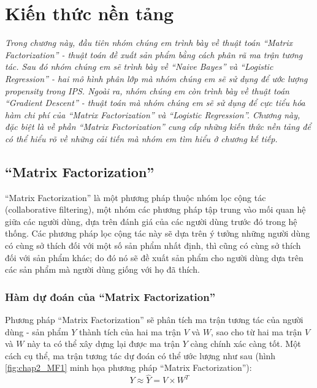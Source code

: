 \chapter{Kiến thức nền tảng}
\label{Chapter2}

\noindent \textit{Trong chương này, đầu tiên nhóm chúng em trình bày về thuật toán ``Matrix Factorization'' - thuật toán đề xuất sản phẩm bằng cách phân rã ma trận tương tác. Sau đó nhóm chúng em sẽ trình bày về ``Naive Bayes'' và ``Logistic Regression'' - hai mô hình phân lớp mà nhóm chúng em sẽ sử dụng để ước lượng propensity trong IPS. Ngoài ra, nhóm chúng em còn trình bày về thuật toán ``Gradient Descent'' - thuật toán mà nhóm chúng em sẽ sử dụng để cực tiểu hóa hàm chi phí của  ``Matrix Factorization'' và ``Logistic Regression''. Chương này, đặc biệt là về phần ``Matrix Factorization'' cung cấp những kiến thức nền tảng để có thể hiểu rõ về những cải tiến mà nhóm em tìm hiểu ở chương kế tiếp.}

\section{``Matrix Factorization''}
\label{section:MF}
``Matrix Factorization'' là một phương pháp thuộc nhóm lọc cộng tác (collaborative filtering), một nhóm các phương pháp tập trung vào mối quan hệ giữa các người dùng, dựa trên đánh giá của các người dùng trước đó trong hệ thống. Các phương pháp lọc cộng tác này sẽ dựa trên ý tưởng những người dùng có cùng sở thích đối với một số sản phẩm nhất định, thì cũng có cùng sở thích đối với sản phẩm khác; do đó nó sẽ đề xuất sản phẩm cho người dùng dựa trên các sản phẩm mà người dùng giống với họ đã thích.

\subsection{Hàm dự đoán của ``Matrix Factorization''}
Phương pháp ``Matrix Factorization'' sẽ phân tích ma trận tương tác của người dùng - sản phẩm $Y$ thành tích của hai ma trận $V$ và $W$, sao cho từ hai ma trận $V$ và $W$ này ta có thể xây dựng lại được ma trận $Y$ càng chính xác càng tốt. Một cách cụ thể, ma trận tương tác dự đoán có thể ước lượng như sau (hình \ref{fig:chap2_MF1} minh họa phương pháp ``Matrix Factorization''):
\begin{equation}
\label{eq:2.1_MF}
    Y \approx \hat{Y} = V \times W^T
\end{equation}

